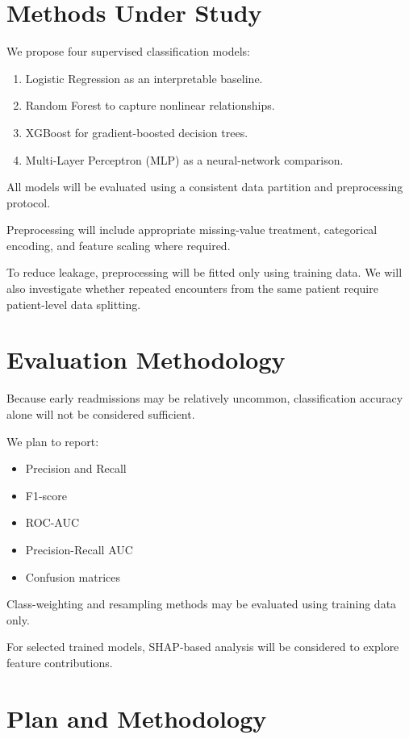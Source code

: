 \documentclass[conference]{IEEEtran}
\begin{document}
\section{Methods Under Study}

We propose four supervised classification models:

\begin{enumerate}
    \item Logistic Regression as an interpretable
    baseline.
    \item Random Forest to capture nonlinear
    relationships.
    \item XGBoost for gradient-boosted decision trees.
    \item Multi-Layer Perceptron (MLP) as a
    neural-network comparison.
\end{enumerate}

All models will be evaluated using a consistent
data partition and preprocessing protocol.

Preprocessing will include appropriate missing-value
treatment, categorical encoding, and feature scaling
where required.

To reduce leakage, preprocessing will be fitted
only using training data. We will also investigate
whether repeated encounters from the same patient
require patient-level data splitting.

\section{Evaluation Methodology}

Because early readmissions may be relatively
uncommon, classification accuracy alone will not
be considered sufficient.

We plan to report:
\begin{itemize}
    \item Precision and Recall
    \item F1-score
    \item ROC-AUC
    \item Precision-Recall AUC
    \item Confusion matrices
\end{itemize}

Class-weighting and resampling methods may be
evaluated using training data only.

For selected trained models, SHAP-based analysis
will be considered to explore feature contributions.

\section{Plan and Methodology}
\end{document}
